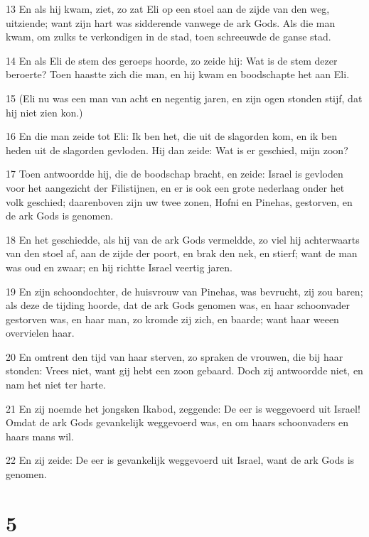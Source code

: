 \par 13 En als hij kwam, ziet, zo zat Eli op een stoel aan de zijde van den weg, uitziende; want zijn hart was sidderende vanwege de ark Gods. Als die man kwam, om zulks te verkondigen in de stad, toen schreeuwde de ganse stad.
\par 14 En als Eli de stem des geroeps hoorde, zo zeide hij: Wat is de stem dezer beroerte? Toen haastte zich die man, en hij kwam en boodschapte het aan Eli.
\par 15 (Eli nu was een man van acht en negentig jaren, en zijn ogen stonden stijf, dat hij niet zien kon.)
\par 16 En die man zeide tot Eli: Ik ben het, die uit de slagorden kom, en ik ben heden uit de slagorden gevloden. Hij dan zeide: Wat is er geschied, mijn zoon?
\par 17 Toen antwoordde hij, die de boodschap bracht, en zeide: Israel is gevloden voor het aangezicht der Filistijnen, en er is ook een grote nederlaag onder het volk geschied; daarenboven zijn uw twee zonen, Hofni en Pinehas, gestorven, en de ark Gods is genomen.
\par 18 En het geschiedde, als hij van de ark Gods vermeldde, zo viel hij achterwaarts van den stoel af, aan de zijde der poort, en brak den nek, en stierf; want de man was oud en zwaar; en hij richtte Israel veertig jaren.
\par 19 En zijn schoondochter, de huisvrouw van Pinehas, was bevrucht, zij zou baren; als deze de tijding hoorde, dat de ark Gods genomen was, en haar schoonvader gestorven was, en haar man, zo kromde zij zich, en baarde; want haar weeen overvielen haar.
\par 20 En omtrent den tijd van haar sterven, zo spraken de vrouwen, die bij haar stonden: Vrees niet, want gij hebt een zoon gebaard. Doch zij antwoordde niet, en nam het niet ter harte.
\par 21 En zij noemde het jongsken Ikabod, zeggende: De eer is weggevoerd uit Israel! Omdat de ark Gods gevankelijk weggevoerd was, en om haars schoonvaders en haars mans wil.
\par 22 En zij zeide: De eer is gevankelijk weggevoerd uit Israel, want de ark Gods is genomen.

\chapter{5}

